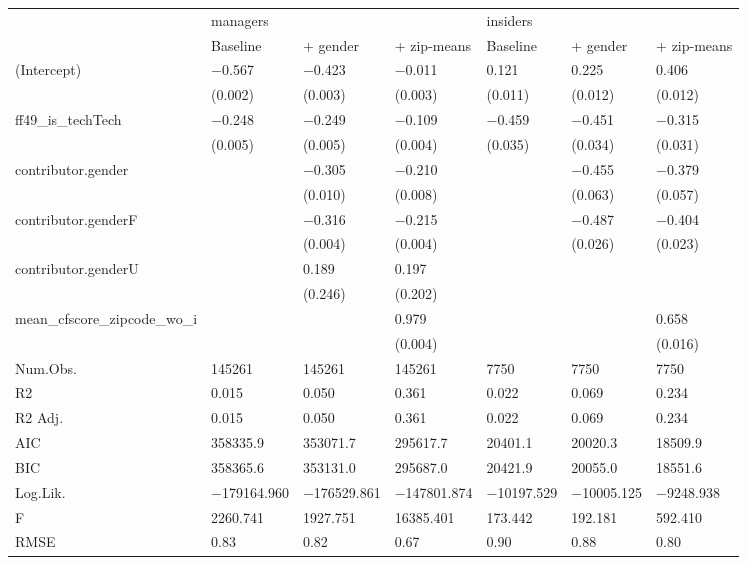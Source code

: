 \begin{tabular}{lllllll}
& managers &  &  & insiders &  &  \\
& Baseline & + gender & + zip-means & Baseline  & + gender  & + zip-means  \\
(Intercept) & \num{-0.567} & \num{-0.423} & \num{-0.011} & \num{0.121} & \num{0.225} & \num{0.406} \\
& (\num{0.002}) & (\num{0.003}) & (\num{0.003}) & (\num{0.011}) & (\num{0.012}) & (\num{0.012}) \\
ff49\_is\_techTech & \num{-0.248} & \num{-0.249} & \num{-0.109} & \num{-0.459} & \num{-0.451} & \num{-0.315} \\
& (\num{0.005}) & (\num{0.005}) & (\num{0.004}) & (\num{0.035}) & (\num{0.034}) & (\num{0.031}) \\
contributor.gender &  & \num{-0.305} & \num{-0.210} &  & \num{-0.455} & \num{-0.379} \\
&  & (\num{0.010}) & (\num{0.008}) &  & (\num{0.063}) & (\num{0.057}) \\
contributor.genderF &  & \num{-0.316} & \num{-0.215} &  & \num{-0.487} & \num{-0.404} \\
&  & (\num{0.004}) & (\num{0.004}) &  & (\num{0.026}) & (\num{0.023}) \\
contributor.genderU &  & \num{0.189} & \num{0.197} &  &  &  \\
&  & (\num{0.246}) & (\num{0.202}) &  &  &  \\
mean\_cfscore\_zipcode\_wo\_i &  &  & \num{0.979} &  &  & \num{0.658} \\
&  &  & (\num{0.004}) &  &  & (\num{0.016}) \\
Num.Obs. & \num{145261} & \num{145261} & \num{145261} & \num{7750} & \num{7750} & \num{7750} \\
R2 & \num{0.015} & \num{0.050} & \num{0.361} & \num{0.022} & \num{0.069} & \num{0.234} \\
R2 Adj. & \num{0.015} & \num{0.050} & \num{0.361} & \num{0.022} & \num{0.069} & \num{0.234} \\
AIC & \num{358335.9} & \num{353071.7} & \num{295617.7} & \num{20401.1} & \num{20020.3} & \num{18509.9} \\
BIC & \num{358365.6} & \num{353131.0} & \num{295687.0} & \num{20421.9} & \num{20055.0} & \num{18551.6} \\
Log.Lik. & \num{-179164.960} & \num{-176529.861} & \num{-147801.874} & \num{-10197.529} & \num{-10005.125} & \num{-9248.938} \\
F & \num{2260.741} & \num{1927.751} & \num{16385.401} & \num{173.442} & \num{192.181} & \num{592.410} \\
RMSE & \num{0.83} & \num{0.82} & \num{0.67} & \num{0.90} & \num{0.88} & \num{0.80} \\
\end{tabular}
